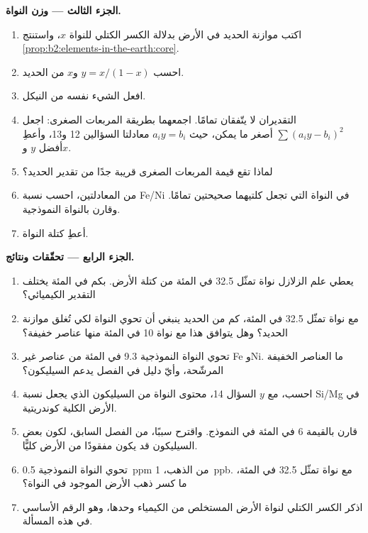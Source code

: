 \begin{problem}
\noindent\textbf{الجزء الثالث --- وزن النواة.}
\begin{enumerate}[resume]
\item اكتب موازنة الحديد في الأرض بدلالة الكسر الكتلي للنواة $x$،
واستنتج \cref{prop:b2:elements-in-the-earth:core}.
\item احسب $y = x/(1-x)$ و$x$ من الحديد.
\item افعل الشيء نفسه من النيكل.
\item التقديران لا يتّفقان تمامًا. اجمعهما بطريقة المربعات الصغرى:
اجعل $\sum (a_iy - b_i)^2$ أصغر ما يمكن، حيث $a_i y = b_i$ معادلتا
السؤالين 12 و13، وأعطِ أفضل $y$ و$x$.
\item لماذا تقع قيمة المربعات الصغرى قريبة جدًا من تقدير الحديد؟
\item من المعادلتين، احسب نسبة Fe/Ni في النواة التي تجعل
كلتيهما صحيحتين تمامًا. وقارن بالنواة النموذجية.
\item أعطِ كتلة النواة.
\end{enumerate}

\noindent\textbf{الجزء الرابع --- تحقّقات ونتائج.}
\begin{enumerate}[resume]
\item يعطي علم الزلازل نواة تمثّل 32.5 في المئة من كتلة الأرض. بكم في
المئة يختلف التقدير الكيميائي؟
\item مع نواة تمثّل 32.5 في المئة، كم من الحديد ينبغي أن تحوي النواة لكي
تُغلق موازنة الحديد؟ وهل يتوافق هذا مع نواة 10 في المئة منها عناصر
خفيفة؟
\item تحوي النواة النموذجية 9.3 في المئة من عناصر غير Fe وNi. ما العناصر
الخفيفة المرشّحة، وأيّ دليل في الفصل يدعم السيليكون؟
\item احسب، مع $y$ السؤال 14، محتوى النواة من السيليكون الذي
يجعل نسبة Si/Mg في الأرض الكلية كوندريتية.
\item قارن بالقيمة 6 في المئة في النموذج. واقترح سببًا، من الفصل
السابق، لكون بعض السيليكون قد يكون مفقودًا من الأرض كليًّا.
\item تحوي النواة النموذجية \qty{0.5}{ppm} من الذهب، 
\qty{1}{ppb}. مع نواة تمثّل 32.5 في المئة، ما كسر ذهب الأرض الموجود
في النواة؟
\item اذكر الكسر الكتلي لنواة الأرض المستخلص من الكيمياء وحدها،
وهو الرقم الأساسي في هذه المسألة.
\end{enumerate}
\end{problem}
